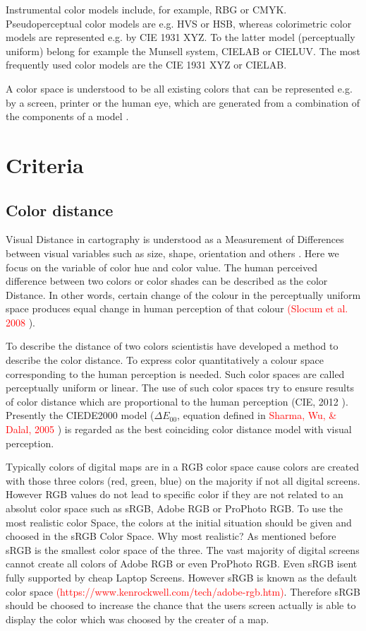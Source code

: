 Instrumental color models include, for example, RBG or CMYK. Pseudoperceptual color models are e.g. HVS or HSB, whereas colorimetric color models are represented e.g. by CIE 1931 XYZ. To the latter model (perceptually uniform) belong for example the Munsell system, CIELAB or CIELUV. The most frequently used color models are the CIE 1931 XYZ or CIELAB. 

A color space is understood to be all existing colors that can be represented e.g. by a screen, printer or the human eye, which are generated from a combination of the components of a model \parencite{munsell1915}.

\section{Criteria}

\subsection{Color distance}\label{subsection:distance}
Visual Distance in cartography is understood as a Measurement of Differences between visual variables such as size, shape, orientation and others \parencite{brychtova2015}. Here we focus on the variable of color hue and color value. The human perceived difference between two colors or color shades can be described as the color Distance. In other words, certain change of the colour in the perceptually uniform space produces equal change in human perception of that colour \textcolor{red}{(Slocum et al. 2008} \parencite{brychtova2017}).

To describe the distance of two colors scientistis have developed a method to describe the color distance. To express color quantitatively a colour space corresponding to the human perception is needed. Such color spaces are called perceptually uniform or linear. The use of such color spaces try to ensure results of color distance which are proportional to the human perception (CIE, 2012 \parencite{brychtova2015}). Presently the CIEDE2000 model ($\Delta E_{00}$, equation defined in \textcolor{red}{Sharma, Wu, \& Dalal, 2005} \parencite{brychtova2015}) is regarded as the best coinciding color distance model with visual perception. 
 
Typically colors of digital maps are in a RGB color space cause colors are created with those three colors (red, green, blue) on the majority if not all digital screens. However RGB values do not lead to specific color if they are not related to an absolut color space such as sRGB, Adobe RGB or ProPhoto RGB. To use the most realistic color Space, the colors at the initial situation should be given and choosed in the sRGB Color Space. Why most realistic? As mentioned before sRGB is the smallest color space of the three. The vast majority of digital screens cannot create all colors of Adobe RGB or even ProPhoto RGB. Even sRGB isent fully supported by cheap Laptop Screens. However sRGB is known as the default color space \textcolor{red}{(https://www.kenrockwell.com/tech/adobe-rgb.htm)}. Therefore sRGB should be choosed to increase the chance that the users screen actually is able to display the color which was choosed by the creater of a map. 

